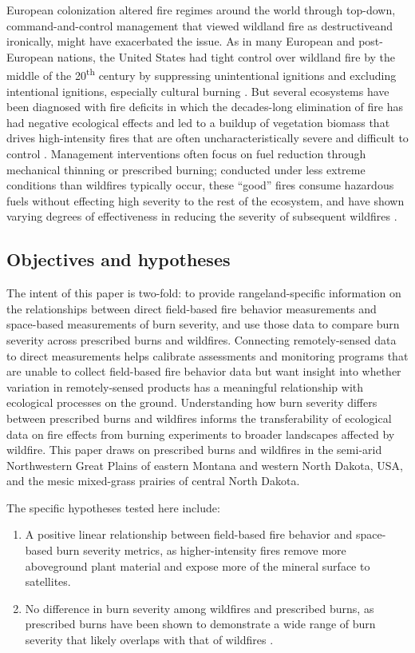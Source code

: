 \documentclass[fire,article,submit,oneauthor,pdftex]{Definitions/mdpi}
\begin{document}
European colonization altered fire regimes around the world through top-down, command-and-control management that viewed wildland fire as destructive\textemdash and ironically, might have exacerbated the issue. 
As in many European and post-European nations, the United States had tight control over wildland fire by the middle of the 20\textsuperscript{th} century by suppressing unintentional ignitions and excluding intentional ignitions, especially cultural burning \cite{mcgranahan2021a, donovan2007}. 
But several ecosystems have been diagnosed with fire deficits in which the decades-long elimination of fire has had negative ecological effects and led to a buildup of vegetation biomass that drives high-intensity fires that are often uncharacteristically severe and difficult to control \cite{parks2015,kolden2019}. 
Management interventions often focus on fuel reduction through mechanical thinning or prescribed burning; conducted under less extreme conditions than wildfires typically occur, these ``good'' fires consume hazardous fuels without effecting high severity to the rest of the ecosystem, and have shown varying degrees of effectiveness in reducing the severity of subsequent wildfires \cite{fernandes2003, brodie2024}. 

\subsection{Objectives and hypotheses} 

The intent of this paper is two-fold: to provide rangeland-specific information on the relationships between direct field-based fire behavior measurements and space-based measurements of burn severity, and use those data to compare burn severity across prescribed burns and wildfires. 
Connecting remotely-sensed data to direct measurements helps calibrate assessments and monitoring programs that are unable to collect field-based fire behavior data but want insight into whether variation in remotely-sensed products has a meaningful relationship with ecological processes on the ground. 
Understanding how burn severity differs between prescribed burns and wildfires informs the transferability of ecological data on fire effects from burning experiments to broader landscapes affected by wildfire.
This paper draws on prescribed burns and wildfires in the semi-arid Northwestern Great Plains of eastern Montana and western North Dakota, USA, and the mesic mixed-grass prairies of central North Dakota.

The specific hypotheses tested here include: 
\begin{enumerate} 
	\item A positive linear relationship between field-based fire behavior and space-based burn severity metrics, as higher-intensity fires remove more aboveground plant material and expose more of the mineral surface to satellites.
	\item No difference in burn severity among wildfires and prescribed burns, as prescribed burns have been shown to demonstrate a wide range of burn severity that likely overlaps with that of wildfires \cite[e.g., ][]{mcgranahan2025}. 
\end{enumerate}
\end{document}
